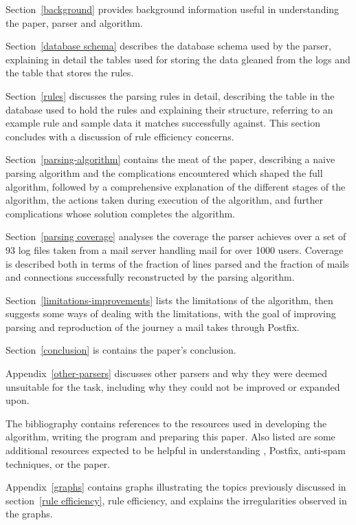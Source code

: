 \documentclass[a4paper,12pt,draft]{article}
\begin{document}
Section~\ref{background} provides background information useful in
understanding the paper, parser and algorithm.

Section~\ref{database schema} describes the database schema used by the
parser, explaining in detail the tables used for storing the data gleaned
from the logs and the table that stores the rules.

Section~\ref{rules} discusses the parsing rules in detail, describing the
table in the database used to hold the rules and explaining their
structure, referring to an example rule and sample data it matches
successfully against.  This section concludes with a discussion of rule
efficiency concerns.

Section~\ref{parsing-algorithm} contains the meat of the paper, describing
a naive parsing algorithm and the complications encountered which shaped
the full algorithm, followed by a comprehensive explanation of the
different stages of the algorithm, the actions taken during execution of
the algorithm, and further complications whose solution completes the
algorithm.

Section~\ref{parsing coverage} analyses the coverage the parser achieves
over a set of 93 log files taken from a mail server handling mail for over
1000 users.  Coverage is described both in terms of the fraction of lines
parsed and the fraction of mails and connections successfully reconstructed
by the parsing algorithm.

Section~\ref{limitations-improvements} lists the limitations of the
algorithm, then suggests some ways of dealing with the limitations, with
the goal of improving parsing and reproduction of the journey a mail takes
through Postfix.

Section~\ref{conclusion} is contains the paper's conclusion.

Appendix~\ref{other-parsers} discusses other parsers and why they were
deemed unsuitable for the task, including why they could not be improved or
expanded upon.

The bibliography contains references to the resources used in developing
the algorithm, writing the program and preparing this paper.  Also listed
are some additional resources expected to be helpful in understanding
\SMTP{}, Postfix, anti-spam techniques, or the paper.

Appendix~\ref{graphs} contains graphs illustrating the topics previously
discussed in section~\ref{rule efficiency}, rule efficiency, and explains
the irregularities observed in the graphs.
\end{document}

